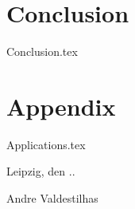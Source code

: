 \documentclass[a4paper,twoside,abstracton,12pt,BCOR=15mm]{scrreprt}
\begin{document}
\chapter{Conclusion} \label{ch:conclusion}
{Conclusion.tex}

\appendix

\chapter{Appendix}
{Applications.tex}










\vspace{20pt}\noindent
Leipzig, den \the\day.\the\month.\the\year

\vspace{80pt}\noindent
Andre Valdestilhas
\end{document}
